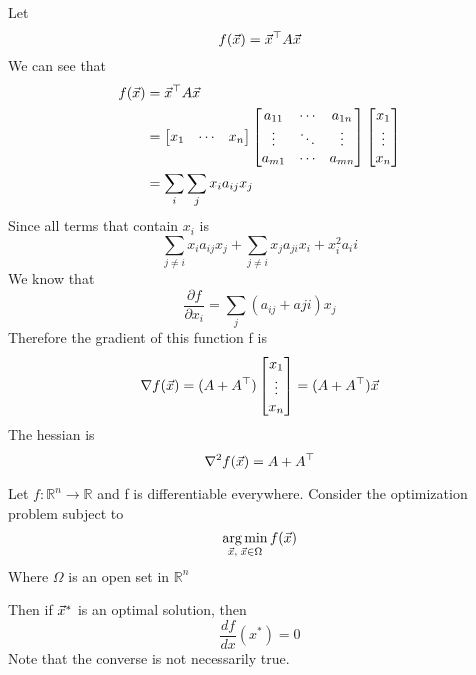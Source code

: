 \begin{example}
	Let
	\[
f(\vec{x}) = \vec{x}^\top A\vec{x}
	\]
	We can see that
	\begin{align*}
		f(\vec{x}) &= \vec{x}^\top A\vec{x}\\
		&= \begin{bmatrix}
			x_1&\cdots&x_n
		\end{bmatrix}\begin{bmatrix}
			a_{11}&\cdots&a_{1n}\\
			\vdots&\ddots&\vdots\\
			a_{m1}&\cdots&a_{mn}
		\end{bmatrix}\begin{bmatrix}
			x_1\\\vdots\\x_n
		\end{bmatrix}\\
		&= \sum_i\sum_j x_ia_{ij}x_j
	\end{align*}
	Since all terms that contain $x_i$ is
	\[
\sum_{j\neq i}x_ia_{ij}x_j+\sum_{j\neq i}x_ja_{ji}x_i+x_i^2a_ii
	\]
	We know that
	\[
\frac{\partial f}{\partial x_i} = \sum_j(a_{ij}+a{ji})x_j
	\]
	Therefore the gradient of this function f is
	\[
\nabla f(\vec{x}) = (A+A^\top)\begin{bmatrix}
	x_1\\\vdots\\x_n
\end{bmatrix} = (A+A^\top)\vec{x}
	\]
	The hessian is 
	\[
\nabla^2 f(\vec{x}) = A+A^\top
	\]
\end{example}

\begin{theorem}
	Let $f:\mathbb{R}^n\rightarrow\mathbb{R}$ and f is differentiable everywhere. Consider the optimization problem subject to
	\[
\operatorname*{arg\,min}_{\vec{x},\;\vec{x}\in \Omega} f(\vec{x})
	\]
Where $\Omega$ is an open set in $\mathbb{R}^n$

Then if $\vec{x}^*$ is an optimal solution, then
\[
\frac{df}{dx}(x^*) = 0
\]
Note that the converse is not necessarily true.
\end{theorem}

